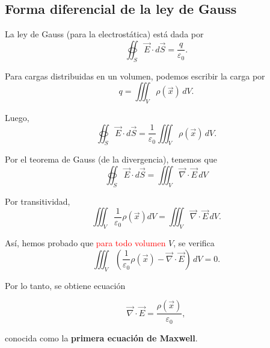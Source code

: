 \subsection{Forma diferencial de la ley de Gauss}

La ley de Gauss (para  la electrostática) está dada por
$$\oiint_S \vec{E} \cdot d\vec{S} = \frac{q}{\varepsilon_0}.$$

Para cargas distribuidas en un volumen, podemos escribir la carga por
$$q = \iiint_V \rho(\vec{x}) \,dV.$$

Luego, 
$$\oiint_S \vec{E} \cdot d\vec{S} = \frac{1}{\varepsilon_0} \iiint_V \rho(\vec{x}) \,dV.$$

Por el teorema de Gauss (de la divergencia), tenemos que
$$\oiint_S \vec{E} \cdot d\vec{S} = \iiint_V \vec{\nabla} \cdot \vec{E} \,dV$$ 

Por transitividad, 
\begin{equation*}
\iiint_V \frac{1}{\varepsilon_0} \rho (\vec{x}) d V =   \iiint_V \vec{\nabla} \cdot \vec{E} \,dV.
\end{equation*}

Así, hemos probado que \textcolor{red}{para todo volumen} $V$, se verifica
$$\iiint_V \left( \frac{1}{\varepsilon_0} \rho (\vec{x}) - \vec{\nabla} \cdot \vec{E}  \right) \, dV= 0.$$


Por lo tanto, se obtiene ecuación
\begin{shaded}
$$\vec{\nabla} \cdot \vec{E} = \frac{\rho(\vec{x})}{\varepsilon_0},$$    
\end{shaded}

conocida como la \textbf{primera ecuación de Maxwell}.

